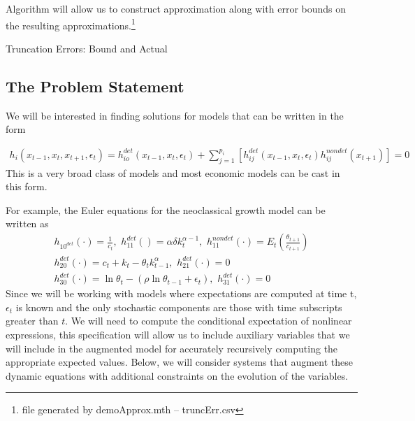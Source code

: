 \documentclass[12pt]{article}
\begin{document}
Algorithm will allow us to construct approximation along with error bounds on the resulting approximations.\footnote{file generated by demoApprox.mth -- {truncErr.csv}}

\begin{table}
  \centering
{}

  \caption{Truncation Errors: Bound and Actual}
\label{truncTab}
\end{table}

  \subsection{The Problem Statement}

We will be interested in finding solutions for models that can be written in  the form


\begin{gather*}
  h_i(x_{t-1},x_{t},x_{t+1},\epsilon_t)=h^{det}_{io}(x_{t-1},x_{t},\epsilon_t)+\sum_{j=1}^{p_i} [h^{det}_{ij}(x_{t-1},x_{t},\epsilon_t)h^{nondet}_{ij}(x_{t+1})]=0
\end{gather*}
This is a very broad class of models and most economic models can 
be cast in this form.  

For example, the Euler equations for the  neoclassical growth  model 
\label{sec:simple-rbc-model-ext} can be written as
\begin{gather}
h_{10^{det}}(\cdot)=\frac{1}{c_t},\,\,
h_{11}^{det}()=\alpha \delta k_{t}^{\alpha-1} ,\,\,
h_{11}^{nondet}(\cdot)=E_t \left (\frac{\theta_{t+1}}{c_{t+1}} \right )\\
h_{20}^{det}(\cdot)=c_t + k_t-\theta_tk_{t-1}^\alpha,\,\,
h_{21}^{det}(\cdot)=0\\
h_{30}^{det}(\cdot)=\ln \theta_t -(\rho \ln \theta_{t-1} + \epsilon_t),\,\,
h_{31}^{det}(\cdot)=0
\end{gather}
Since we will be working with models where expectations are computed at time t, $\epsilon_t$ is known and the only stochastic components are those with time subscripts greater than $t$. We will need to compute 
the conditional expectation of nonlinear expressions,  
this specification will allow us to include auxiliary
variables that we will include in the augmented model for 
accurately recursively computing  the appropriate expected values.
Below, we will consider 
systems that augment these dynamic equations with additional constraints 
on the evolution of the variables.
\end{document}
